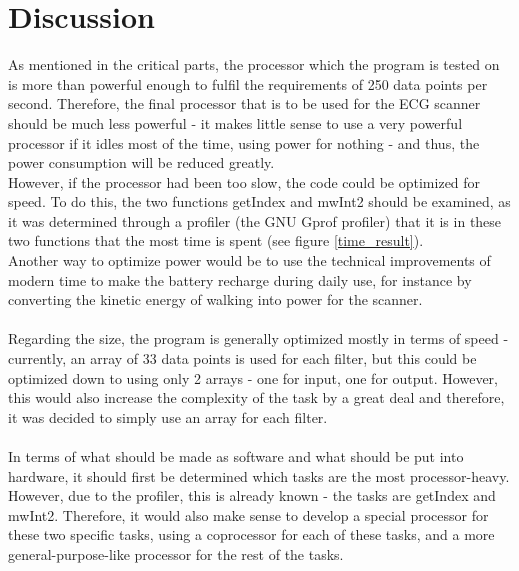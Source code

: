\documentclass[12pt,a4paper]{article}
\begin{document}
\section{Discussion}
	As mentioned in the critical parts, the processor which the program is tested on is more than powerful enough to fulfil the requirements of 250 data points per second. Therefore, the final processor that is to be used for the ECG scanner should be much less powerful - it makes little sense to use a very powerful processor if it idles most of the time, using power for nothing - and thus, the power consumption will be reduced greatly.\\
	However, if the processor had been too slow, the code could be optimized for speed. To do this, the two functions getIndex and mwInt2 should be examined, as it was determined through a profiler (the GNU Gprof profiler) that it is in these two functions that the most time is spent (see figure \ref{time_result}).\\
	Another way to optimize power would be to use the technical improvements of modern time to make the battery recharge during daily use, for instance by converting the kinetic energy of walking into power for the scanner.\\
	\\
	Regarding the size, the program is generally optimized mostly in terms of speed - currently, an array of 33 data points is used for each filter, but this could be optimized down to using only 2 arrays - one for input, one for output. However, this would also increase the complexity of the task by a great deal and therefore, it was decided to simply use an array for each filter.\\
	\\
	In terms of what should be made as software and what should be put into hardware, it should first be determined which tasks are the most processor-heavy. However, due to the profiler, this is already known - the tasks are getIndex and mwInt2. Therefore, it would also make sense to develop a special processor for these two specific tasks, using a coprocessor for each of these tasks, and a more general-purpose-like processor for the rest of the tasks.\\
	
\end{document}

